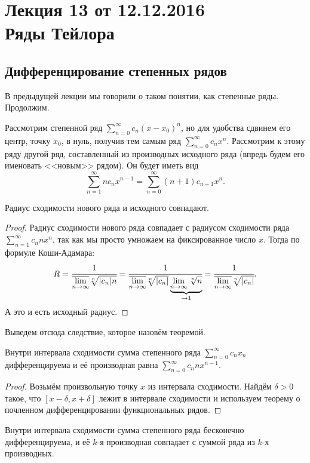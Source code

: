 \documentclass[a4paper, 12pt]{article}
\begin{document}
\pagestyle{fancy}
\section{Лекция 13 от 12.12.2016 \\ Ряды Тейлора}

\subsection{Дифференцирование степенных рядов}

В предыдущей лекции мы говорили о таком понятии, как степенные ряды. Продолжим.
\par Рассмотрим степенной ряд $\sum\limits_{n = 0}^{\infty}c_n (x-x_0)^n$, но для удобства сдвинем его центр, точку $x_0$, в нуль, получив тем самым ряд $\sum\limits_{n = 0}^{\infty}c_n x^n$. Рассмотрим к этому ряду другой ряд, составленный из производных исходного ряда (впредь будем его именовать <<новым>> рядом). Он будет иметь вид
\[
    \sum\limits_{n = 1}^{\infty}nc_n x^{n - 1} = \sum\limits_{n = 0}^{\infty}(n+1)c_{n + 1} x^n.
\]
\begin{Statement}
    Радиус сходимости нового ряда и исходного совпадают.
\end{Statement}
\begin{proof}
	Радиус сходимости нового ряда совпадает с радиусом сходимости ряда $\sum\limits_{n = 1}^{\infty}c_n n x^n$, так как мы просто умножаем на фиксированное число $x$. Тогда по формуле Коши-Адамара:
    \[ 
        R = \cfrac{1}{\overline{\lim\limits_{n\to\infty}}\sqrt[n]{|c_n|n}} = \cfrac{1}{\overline{\lim\limits_{n\to\infty}}\sqrt[n]{|c_n|}\underbrace{\lim\limits_{n\to\infty}\sqrt[n]{n}}_{\to 1}} = \cfrac{1}{\overline{\lim\limits_{n\to\infty}}\sqrt[n]{|c_n|}}.
    \]
    А это и есть исходный радиус.
\end{proof}
Выведем отсюда следствие, которое назовём теоремой.
\begin{Theorem}
    Внутри интервала сходимости сумма степенного ряда $\sum\limits_{n=0}^{\infty}c_nx_n$ дифференцируема и её производная равна $\sum\limits_{n=0}^{\infty}c_n n x^{n-1}$.
\end{Theorem}
\begin{proof}
    Возьмём произвольную точку $x$ из интервала сходимости. Найдём $\delta > 0$ такое, что $[x-\delta, x + \delta]$ лежит в интервале сходимости и используем теорему о почленном дифференцировании функциональных рядов.
\end{proof}
\begin{Consequence}
    Внутри интервала сходимости сумма степенного ряда бесконечно дифференцируема, и её $k$-я производная совпадает с суммой ряда из $k$-х производных.
\end{Consequence}
\end{document}
